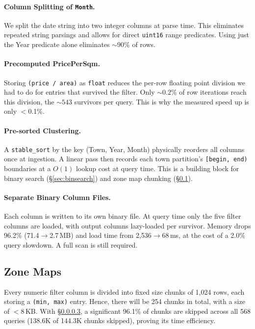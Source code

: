 \documentclass[11pt,a4paper]{article}
\begin{document}
\paragraph{Column Splitting of \texttt{Month}.}
We split the date string into two integer columns at parse time.
This eliminates repeated string parsings and allows for direct \texttt{uint16} range predicates.
Using just the Year predicate alone eliminates ${\sim}90\%$ of rows.

\paragraph{Precomputed PricePerSqm.}
Storing \texttt{(price / area)} as \texttt{float} reduces the per-row floating point division we had to do for entries that survived the filter.
Only ${\sim}0.2\%$ of row iterations reach this division, the ${\sim}543$ survivors per query.
This is why the measured speed up is only $<$0.1\%.

\paragraph{Pre-sorted Clustering.} \label{para:pre_sorted_clustering}
A \texttt{stable\_sort} by the key (Town, Year, Month) physically reorders all columns once at ingestion.
A linear pass then records each town partition's \texttt{[begin, end)} boundaries at a $O(1)$ lookup cost at query time.
This is a building block for binary search (\S\ref{sec:binsearch}) and zone map chunking (\S\ref{sec:zonemaps}).

\paragraph{Separate Binary Column Files.} \label{para:separate_binary_files}
Each column is written to its own binary file.
At query time only the five filter columns are loaded, with output columns lazy-loaded per survivor.
Memory drops 96.2\% (71.4$\to$2.7\,MB) and load time from 2,536$\to$68\,ms, at the cost of a 2.0\% query slowdown. A full scan is still required.

\subsection{Zone Maps}\label{sec:zonemaps}
Every numeric filter column is divided into fixed size chunks of 1,024 rows, each storing a \texttt{(min, max)} entry.
Hence, there will be 254 chunks in total, with a size of $<$8\,KB.
With \S\ref{para:pre_sorted_clustering}, a significant 96.1\% of chunks are skipped across all 568 queries (138.6K of 144.3K chunks skipped), proving its time efficiency.
\end{document}

